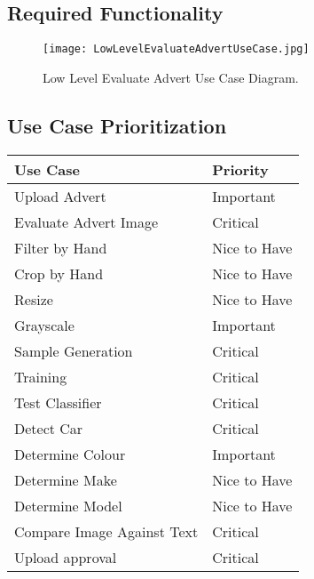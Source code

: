 \subsection{Required Functionality}
\begin{figure}[h!]
  \caption{Low Level Evaluate Advert Use Case Diagram.}
  \centering
	\texttt{[image: LowLevelEvaluateAdvertUseCase.jpg]}
\end{figure}

\subsection{Use Case Prioritization}
\begin{tabular}{l | l}
	Use Case & Priority \\
	\hline
	Upload Advert & Important \\
	Evaluate Advert Image & Critical \\
	
	Filter by Hand & Nice to Have \\
	Crop by Hand & Nice to Have \\
	Resize & Nice to Have \\
	Grayscale & Important \\
		
	Sample Generation & Critical\\
	Training & Critical \\
	Test Classifier & Critical \\
		
	Detect Car & Critical \\
	Determine Colour & Important \\
	Determine Make & Nice to Have \\
	Determine Model & Nice to Have \\
		
	Compare Image Against Text & Critical \\
	Upload approval & Critical \\
\end{tabular}

